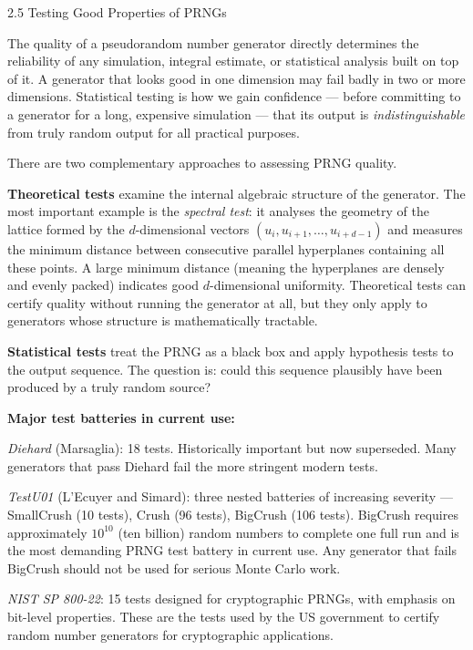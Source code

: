 \documentclass[aspectratio=169,10pt]{beamer}
\begin{document}
\begin{frame}[allowframebreaks]{2.5 Testing Good Properties of PRNGs}

The quality of a pseudorandom number generator directly determines the
reliability of any simulation, integral estimate, or statistical analysis
built on top of it.  A generator that looks good in one dimension may fail
badly in two or more dimensions.  Statistical testing is how we gain
confidence --- before committing to a generator for a long, expensive
simulation --- that its output is \emph{indistinguishable} from truly random
output for all practical purposes.

\medskip
There are two complementary approaches to assessing PRNG quality.

\textbf{Theoretical tests} examine the internal algebraic structure of the
generator.  The most important example is the \emph{spectral test}: it
analyses the geometry of the lattice formed by the $d$-dimensional vectors
$(u_i, u_{i+1}, \ldots, u_{i+d-1})$ and measures the minimum distance
between consecutive parallel hyperplanes containing all these points.  A
large minimum distance (meaning the hyperplanes are densely and evenly
packed) indicates good $d$-dimensional uniformity.  Theoretical tests can
certify quality without running the generator at all, but they only apply
to generators whose structure is mathematically tractable.

\textbf{Statistical tests} treat the PRNG as a black box and apply
hypothesis tests to the output sequence.  The question is: could this
sequence plausibly have been produced by a truly random source?

\medskip
\textbf{Major test batteries in current use:}

\emph{Diehard} (Marsaglia): 18 tests.  Historically important but now
superseded.  Many generators that pass Diehard fail the more stringent
modern tests.

\emph{TestU01} (L'Ecuyer and Simard): three nested batteries of increasing
severity --- SmallCrush (10 tests), Crush (96 tests), BigCrush (106 tests).
BigCrush requires approximately $10^{10}$ (ten billion) random numbers to
complete one full run and is the most demanding PRNG test battery in current
use.  Any generator that fails BigCrush should not be used for serious
Monte Carlo work.

\emph{NIST SP 800-22}: 15 tests designed for cryptographic PRNGs, with
emphasis on bit-level properties.  These are the tests used by the US
government to certify random number generators for cryptographic applications.


\end{frame}
\end{document}
